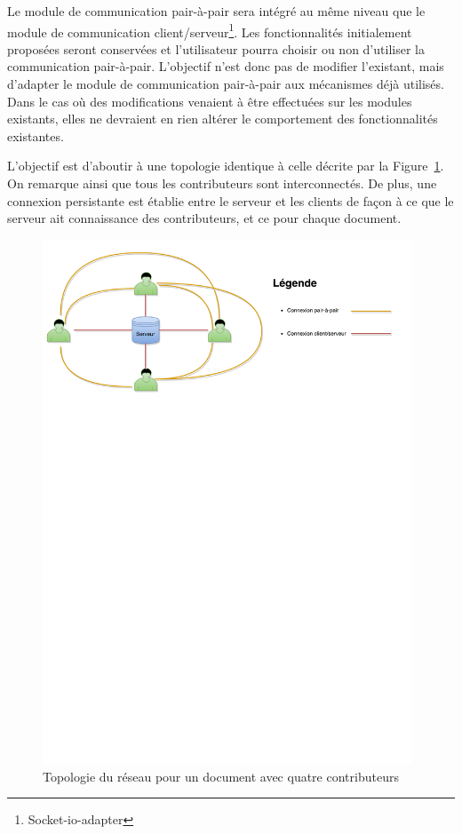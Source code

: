 \documentclass{tnreport}
\begin{document}
Le module de communication pair-à-pair sera intégré au même niveau que le module de communication client/serveur\footnote{Socket-io-adapter}. Les fonctionnalités initialement proposées seront conservées et l'utilisateur pourra choisir ou non d'utiliser la communication pair-à-pair. L'objectif n'est donc pas de modifier l'existant, mais d'adapter le module de communication pair-à-pair aux mécanismes déjà utilisés. Dans le cas où des modifications venaient à être effectuées sur les modules existants, elles ne devraient en rien  altérer le comportement des fonctionnalités existantes.

L'objectif est d'aboutir à une topologie identique à celle décrite par la Figure~\ref{fig:topo-webRTC}. On remarque ainsi que tous les contributeurs sont interconnectés. De plus, une connexion persistante est établie entre le serveur et les clients de façon à ce que le serveur ait connaissance des contributeurs, et ce pour chaque document.

\begin{figure}[!h]
  \centering
  \includegraphics[width=11cm]{figures/topo-webRTC}
  \caption{Topologie du réseau pour un document avec quatre contributeurs}
  \label{fig:topo-webRTC}
\end{figure}
\end{document}
